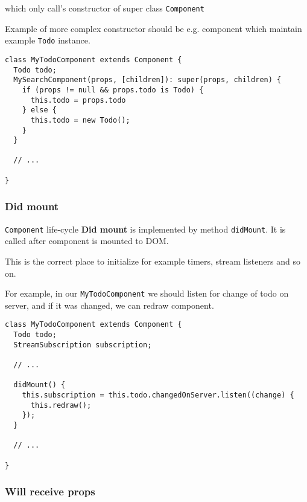 \documentclass[oneside, 12pt]{book}
\begin{document}

      which only call's constructor of super class \texttt{Component}

      Example of more complex constructor should be e.g. component 
      which maintain example \texttt{Todo} instance.
      \begin{verbatim}
class MyTodoComponent extends Component {
  Todo todo;
  MySearchComponent(props, [children]): super(props, children) {
    if (props != null && props.todo is Todo) {
      this.todo = props.todo
    } else {
      this.todo = new Todo();
    }
  }

  // ...

}
      \end{verbatim}



    \subsubsection{Did mount}\label{subsec:our-architecture-lifecycle-didmount}

      \texttt{Component} life-cycle \textbf{Did mount} is implemented by method \texttt{didMount}. 
      It is called after component is mounted to DOM. 

      This is the correct place to initialize for example timers, stream listeners and so on. 

      For example, in our \texttt{MyTodoComponent} we should listen for change of todo on server, 
      and if it was changed, we can redraw component.
      \begin{verbatim}
class MyTodoComponent extends Component {
  Todo todo;
  StreamSubscription subscription;

  // ...

  didMount() {
    this.subscription = this.todo.changedOnServer.listen((change) {
      this.redraw();
    });
  }

  // ...

}
      \end{verbatim}



    \subsubsection{Will receive props}\label{subsec:our-architecture-lifecycle-willreceiveprops}
\end{document}
